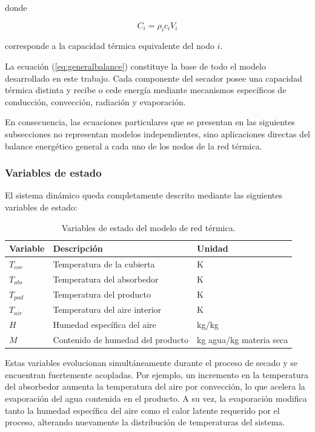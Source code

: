 donde

\[
C_i=\rho_i c_iV_i
\]

corresponde a la capacidad térmica equivalente del nodo $i$.

La ecuación (\ref{eq:generalbalance}) constituye la base de todo el modelo desarrollado en este trabajo. Cada componente del secador posee una capacidad térmica distinta y recibe o cede energía mediante mecanismos específicos de conducción, convección, radiación y evaporación.

En consecuencia, las ecuaciones particulares que se presentan en las siguientes subsecciones no representan modelos independientes, sino aplicaciones directas del balance energético general a cada uno de los nodos de la red térmica.

\subsubsection{Variables de estado}

El sistema dinámico queda completamente descrito mediante las siguientes variables de estado:

\begin{table}
\centering
\caption{Variables de estado del modelo de red térmica.}
\begin{tabular}{lll}
\toprule
Variable & Descripción & Unidad\\
\midrule
$T_{cov}$ & Temperatura de la cubierta & K\\
$T_{abs}$ & Temperatura del absorbedor & K\\
$T_{pad}$ & Temperatura del producto & K\\
$T_{air}$ & Temperatura del aire interior & K\\
$H$ & Humedad específica del aire & kg/kg\\
$M$ & Contenido de humedad del producto & kg agua/kg materia seca\\
\bottomrule
\end{tabular}
\end{table}

Estas variables evolucionan simultáneamente durante el proceso de secado y se encuentran fuertemente acopladas. Por ejemplo, un incremento en la temperatura del absorbedor aumenta la temperatura del aire por convección, lo que acelera la evaporación del agua contenida en el producto. A su vez, la evaporación modifica tanto la humedad específica del aire como el calor latente requerido por el proceso, alterando nuevamente la distribución de temperaturas del sistema.

